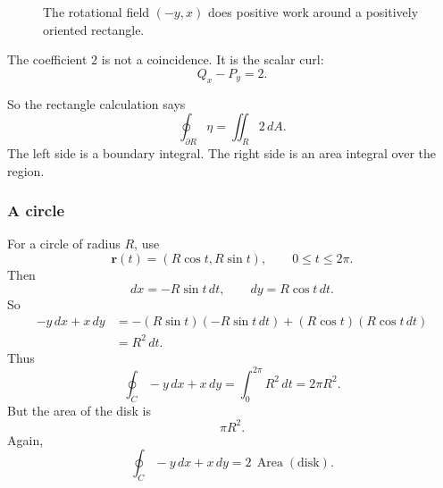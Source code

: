 \begin{figure}[h]
\centering
{}
\caption{The rotational field \((-y,x)\) does positive work around a positively oriented
rectangle.}
\end{figure}
The coefficient \(2\) is not a coincidence.  It is the scalar curl:
\[
    Q_x-P_y=2.
\]

So the rectangle calculation says
\[
\boxed{
    \oint_{\partial R}\eta
    =
    \iint_R 2\,dA.
}
\]
The left side is a boundary integral.  The right side is an area integral over the region.

\subsubsection*{A circle}

For a circle of radius \(R\), use
\[
    \mathbf r(t)=(R\cos t,R\sin t),
    \qquad 0\le t\le2\pi.
\]
Then
\[
    dx=-R\sin t\,dt,
    \qquad
    dy=R\cos t\,dt.
\]
So
\[
\begin{aligned}
-y\,dx+x\,dy
&=
-(R\sin t)(-R\sin t\,dt)
+
(R\cos t)(R\cos t\,dt)\\
&=
R^2\,dt.
\end{aligned}
\]
Thus
\[
\boxed{
    \oint_C -y\,dx+x\,dy
    =
    \int_0^{2\pi}R^2\,dt
    =
    2\pi R^2.
}
\]
But the area of the disk is
\[
    \pi R^2.
\]
Again,
\[
\boxed{
    \oint_C -y\,dx+x\,dy
    =
    2\,\operatorname{Area}(\text{disk}).
}
\]

